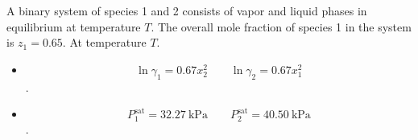 \documentclass{article}
\begin{document}
A binary system of species 1 and 2 consists of vapor and liquid
phases in equilibrium at temperature $T$. The overall mole fraction
of species 1 in the system is $z_{1}=0.65$. At temperature $T$.
\begin{itemize}
  \item \[ \ln \gamma_{1}=0.67x_{2}^{2} \qquad \ln \gamma_{2}=0.67x_{1}^{2} \].
  \item \[ P_{1}^{\text{sat}}=32.27~\unit{\kilo\pascal} \qquad
    P_{2}^{\text{sat}}=40.50~\unit{\kilo\pascal} \].
\end{itemize}
\begin{SOLUTION}

\end{SOLUTION}
\end{document}
